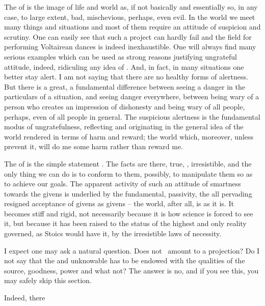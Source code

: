 \pa\label{adingratitude} The   of
 is the image of life and world as, if not basically
and essentially so, in any case, to large extent, bad, mischevious,
perhaps, even evil.  In the world we meet many things and situations
and most of them require an attitude of suspicion and scrutiny.  One
can easily see that such a project can hardly fail and the field for
performing Voltairean dances is indeed inexhaustible.  One will always
find many serious examples which can be used as strong reasons
justifying ungrateful attitude, indeed, ridiculing any idea of
.  And, in fact, in many situations one better stay
alert.  I am not saying that there are no healthy forms of alertness. 
But there is a great, a fundamental difference between seeing a danger
in the particulars of a situation, and seeing danger everywhere,
between being wary of a person who creates an impression of dishonesty
and being wary of all people, perhaps, even of all people in general. 
The suspicious alertness is the fundamental modus of ungratefulness,
reflecting and originating in the general idea of the world rendered
in terms of harm and reward; the world which, moreover, unless 
prevent it, will do me some harm rather than reward me.


\pa\label{adclosedness} The   of
 is the simple statement . 
The facts are there, true, , irresistible, and the only
thing we can do is to conform to them, possibly, to manipulate them so
as to achieve our goals.  The apparent activity of such an attitude of
smartness towards the givens is underlied by the fundamental,
 passivity, the all pervading resigned acceptance of
givens as givens -- the world, after all, is as it is.  It becomes
stiff and rigid, not necessarily because it is how science is forced
to see it, but because it has been raised to the status of the highest and
only reality governed, as Stoics would have it, by the irresistible 
laws of necessity.


\pa I expect one may ask a natural question.  Does not \sch\ amount to
a projection?  Do I not say that the  and unknowable
 has to be endowed with the qualities of the source, goodness,
power and what not?  The answer is no, and if you see this, you may
safely skip this section.

Indeed, 
there 

